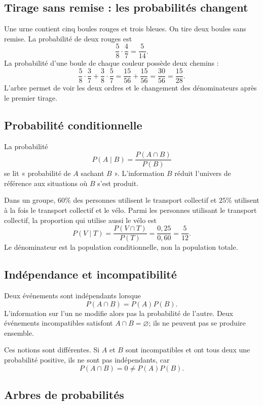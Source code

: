 \documentclass[12pt,a4paper,openany]{book}
\begin{document}
\subsection{Tirage sans remise : les probabilités changent}

Une urne contient cinq boules rouges et trois bleues. On tire deux boules sans remise. La probabilité de deux rouges est
\[
\frac58\cdot\frac47=\frac5{14}.
\]
La probabilité d'une boule de chaque couleur possède deux chemins :
\[
\frac58\cdot\frac37+\frac38\cdot\frac57
=\frac{15}{56}+\frac{15}{56}
=\frac{30}{56}=\frac{15}{28}.
\]
L'arbre permet de voir les deux ordres et le changement des dénominateurs après le premier tirage.

\subsection{Probabilité conditionnelle}

La probabilité
\[
P(A\mid B)=\frac{P(A\cap B)}{P(B)}
\]
se lit « probabilité de $A$ sachant $B$ ». L'information $B$ réduit l'univers de référence aux situations où $B$ s'est produit.

\begin{examplebox}
Dans un groupe, $60\%$ des personnes utilisent le transport collectif et $25\%$ utilisent à la fois le transport collectif et le vélo. Parmi les personnes utilisant le transport collectif, la proportion qui utilise aussi le vélo est
\[
P(V\mid T)=\frac{P(V\cap T)}{P(T)}=\frac{0{,}25}{0{,}60}=\frac5{12}.
\]
Le dénominateur est la population conditionnelle, non la population totale.
\end{examplebox}

\subsection{Indépendance et incompatibilité}

Deux événements sont indépendants lorsque
\[
P(A\cap B)=P(A)P(B).
\]
L'information sur l'un ne modifie alors pas la probabilité de l'autre. Deux événements incompatibles satisfont $A\cap B=\varnothing$; ils ne peuvent pas se produire ensemble.

Ces notions sont différentes. Si $A$ et $B$ sont incompatibles et ont tous deux une probabilité positive, ils ne sont pas indépendants, car
\[
P(A\cap B)=0\neq P(A)P(B).
\]

\subsection{Arbres de probabilités}
\end{document}
